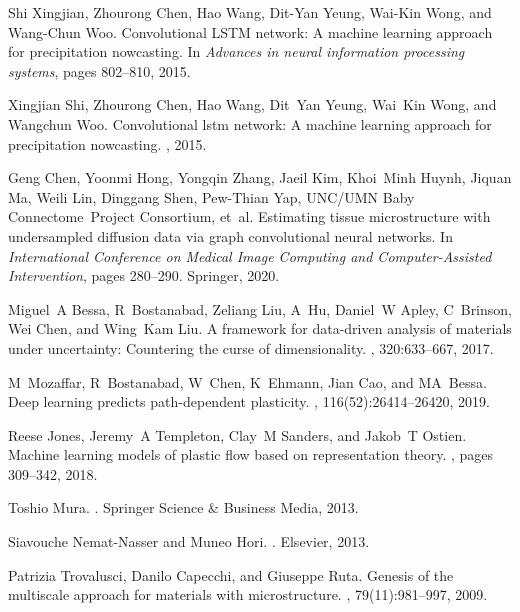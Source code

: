 \documentclass[12pt,reqno]{article}
\begin{document}
\begin{thebibliography}{10}
Shi Xingjian, Zhourong Chen, Hao Wang, Dit-{Y}an Yeung, Wai-{K}in Wong, and
Wang-{C}hun Woo.
\newblock Convolutional {LSTM} network: A machine learning approach for
precipitation nowcasting.
\newblock In {\em Advances in neural information processing systems}, pages
802--810, 2015.

Xingjian Shi, Zhourong Chen, Hao Wang, Dit~Yan Yeung, Wai~Kin Wong, and
Wangchun Woo.
\newblock Convolutional lstm network: A machine learning approach for
precipitation nowcasting.
, 2015.

Geng Chen, Yoonmi Hong, Yongqin Zhang, Jaeil Kim, Khoi~Minh Huynh, Jiquan Ma,
Weili Lin, Dinggang Shen, Pew-Thian Yap, UNC/UMN Baby Connectome~Project
Consortium, et~al.
\newblock Estimating tissue microstructure with undersampled diffusion data via
graph convolutional neural networks.
\newblock In {\em International Conference on Medical Image Computing and
Computer-Assisted Intervention}, pages 280--290. Springer, 2020.

Miguel~A Bessa, R~Bostanabad, Zeliang Liu, A~Hu, Daniel~W Apley, C~Brinson, Wei
Chen, and Wing~Kam Liu.
\newblock A framework for data-driven analysis of materials under uncertainty:
Countering the curse of dimensionality.
,
320:633--667, 2017.

M~Mozaffar, R~Bostanabad, W~Chen, K~Ehmann, Jian Cao, and MA~Bessa.
\newblock Deep learning predicts path-dependent plasticity.
,
116(52):26414--26420, 2019.

Reese Jones, Jeremy~A Templeton, Clay~M Sanders, and Jakob~T Ostien.
\newblock Machine learning models of plastic flow based on representation
theory.
, pages 309--342,
2018.

Toshio Mura.
.
\newblock Springer Science \& Business Media, 2013.

Siavouche Nemat-Nasser and Muneo Hori.
.
\newblock Elsevier, 2013.

Patrizia Trovalusci, Danilo Capecchi, and Giuseppe Ruta.
\newblock Genesis of the multiscale approach for materials with microstructure.
, 79(11):981--997, 2009.


\end{thebibliography}
\end{document}
